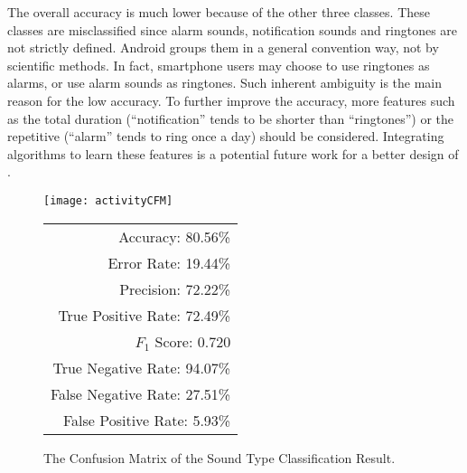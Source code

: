 The overall accuracy is much lower because of the other three classes.  These classes are misclassified since alarm sounds, notification sounds and ringtones are not strictly defined. Android groups them in a general convention way, not by scientific methods. In fact, smartphone users may choose to use ringtones as alarms, or use alarm sounds as ringtones. Such inherent ambiguity is the main reason for the low accuracy. To further improve the accuracy, more features such as the total duration (``notification'' tends to be shorter than ``ringtones'') or the repetitive (``alarm'' tends to ring once a day) should be considered. Integrating algorithms to learn these features is a potential future work for a better design of {\systemName}.
\begin{figure}[!t]
		\begin{minipage}{\linewidth}
		\centering
		\begin{minipage}[c]{0.5\linewidth}			
			\texttt{[image: activityCFM]}
		\end{minipage}
		\begin{minipage}[b]{0.49\linewidth}
		\centering
				\begin{tabular}{r}
				\toprule
				Accuracy: 80.56\% \\ Error Rate: 19.44\% \\
				Precision: 72.22\% \\ True Positive Rate: 72.49\% \\
				$F_1$ Score: 0.720\\ True Negative Rate: 94.07\% \\
				False Negative Rate: 27.51\%  \\  False Positive Rate: 5.93\% \\
				\bottomrule
			\end{tabular}
		\end{minipage}
	\end{minipage}
	
	\vspace{-.1in}
	\caption{The Confusion Matrix of the Sound Type Classification Result.}
	\label{fig:activityCFM}
	\vspace{-.1in}
\end{figure}


